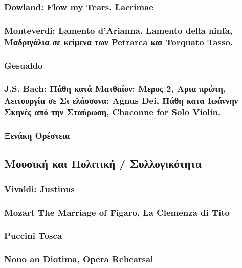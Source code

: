\subsubsection{Dowland: Flow my Tears. Lacrimae}
\label{sec:orgdb39dc5}
\subsubsection{Monteverdi: Lamento d'Arianna. Lamento della ninfa, Μαδριγάλια σε κείμενα των Petrarca και Torquato Tasso.}
\label{sec:orgebbd75b}
\subsubsection{Gesualdo}
\label{sec:orgd70e33b}
\subsubsection{J.S. Bach: Πάθη κατά Ματθαίον: Μερος 2, Αρια πρώτη, Λειτουργία σε Σι ελάσσονα: Agnus Dei, Πάθη κατα Ιωάννην Σκηνές από την Σταύρωση, Chaconne for Solo Violin.}
\label{sec:orgbb02574}
\subsubsection{Ξενάκη Ορέστεια}
\label{sec:orgf6a8ad6}
\subsection{Μουσική και Πολιτική / Συλλογικότητα}
\label{sec:org4c18249}
\subsubsection{Vivaldi: Justinus}
\label{sec:org70ae522}
\subsubsection{Mozart The Marriage of Figaro, La Clemenza di Tito}
\label{sec:org6dbffd0}
\subsubsection{Puccini Tosca}
\label{sec:org422bb04}
\subsubsection{}
\label{sec:orge58864b}
\subsubsection{Nono an Diotima, Opera Rehearsal}
\label{sec:org5245122}
